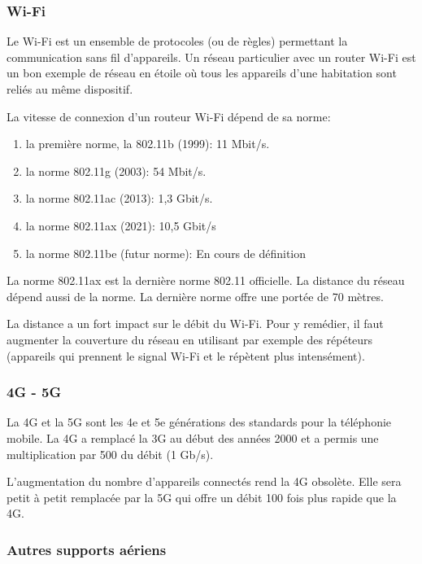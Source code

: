 \documentclass[11pt, a4paper]{book}
\begin{document}
\subsubsection{Wi-Fi}

Le Wi-Fi est un ensemble de protocoles (ou de règles) permettant la communication sans fil d'appareils. Un réseau particulier avec un router Wi-Fi est un bon exemple de réseau en étoile où tous les appareils d'une habitation sont reliés au même dispositif. 

La vitesse de connexion d'un routeur Wi-Fi dépend de sa norme:
\begin{enumerate}
\item la première norme, la 802.11b (1999): 11 Mbit/s.
\item la norme 802.11g (2003): 54 Mbit/s.
\item la norme 802.11ac (2013): 1,3 Gbit/s.
\item la norme 802.11ax (2021): 10,5 Gbit/s
\item la norme 802.11be (futur norme): En cours de définition
\end{enumerate}
La norme 802.11ax est la dernière norme 802.11 officielle. La distance du réseau dépend aussi de la norme. La dernière norme offre une portée de 70 mètres.

\begin{remarque}
La distance a un fort impact sur le débit du Wi-Fi. Pour y remédier, il faut augmenter la couverture du réseau en utilisant par exemple des répéteurs (appareils qui prennent le signal Wi-Fi et le répètent plus intensément). 
\end{remarque}

\subsubsection{4G - 5G}

La 4G et la 5G sont les 4e et 5e générations des standards pour la téléphonie mobile. La 4G a remplacé la 3G au début des années 2000 et a permis une multiplication par 500 du débit (1 Gb/s). 

L'augmentation du nombre d'appareils connectés rend la 4G obsolète. Elle sera petit à petit remplacée par la 5G qui offre un débit 100 fois plus rapide que la 4G.

\subsubsection{Autres supports aériens}
\end{document}
